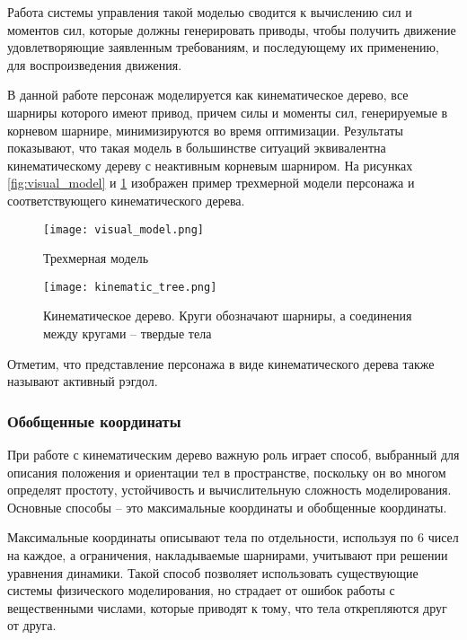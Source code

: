 Работа системы управления такой моделью сводится к вычислению сил и моментов сил, которые должны генерировать приводы, чтобы получить движение удовлетворяющие заявленным требованиям, и последующему их применению, для воспроизведения движения.

В данной работе персонаж моделируется как кинематическое дерево, все шарниры которого имеют привод, причем силы и моменты сил, генерируемые в корневом шарнире, минимизируются во время оптимизации. Результаты показывают, что такая модель в большинстве ситуаций эквивалентна кинематическому дереву с неактивным корневым шарниром. На рисунках \ref{fig:visual_model} и \ref{fig:kinematic_tree} изображен пример трехмерной модели персонажа и соответствующего кинематического дерева.

\begin{figure}
  \begin{minipage}[t]{0.475\textwidth}
    \centering
    \texttt{[image: visual\_model.png]}
    \caption{Трехмерная модель}
    \label{fig:visual_model}
  \end{minipage}
\hfill
  \begin{minipage}[t]{0.475\textwidth}
    \centering
    \texttt{[image: kinematic\_tree.png]}
    \caption{Кинематическое дерево. Круги обозначают шарниры, а соединения между кругами -- твердые тела}
    \label{fig:kinematic_tree}
  \end{minipage}
\end{figure}

Отметим, что представление персонажа в виде кинематического дерева также называют активный рэгдол.

\subsubsection{Обобщенные координаты}

При работе с кинематическим дерево важную роль играет способ, выбранный для описания положения и ориентации тел в пространстве, поскольку он во многом определят простоту, устойчивость и вычислительную сложность моделирования. Основные способы -- это максимальные координаты и обобщенные координаты.

Максимальные координаты описывают тела по отдельности, используя по 6 чисел на каждое, а ограничения, накладываемые шарнирами, учитывают при решении уравнения динамики. Такой способ позволяет использовать существующие системы физического моделирования, но страдает от ошибок работы с вещественными числами, которые приводят к тому, что тела открепляются друг от друга.

